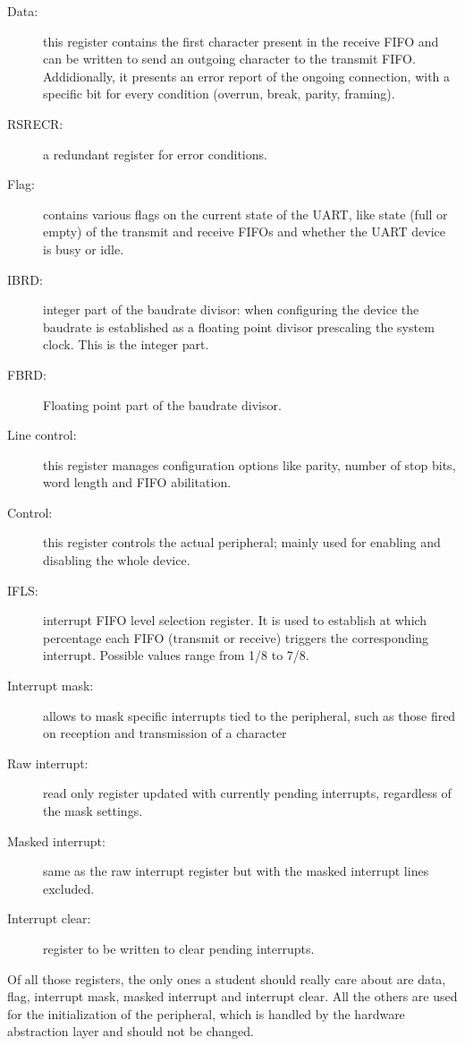 \documentclass[12pt,a4paper,openright,twoside]{report}
\begin{document}
\begin{description}
    \item[Data:] this register contains the first character present in 
            the receive FIFO and can be written to send an outgoing character to 
            the transmit FIFO. Addidionally, it presents an error report of the ongoing
            connection, with a specific bit for every condition (overrun, break,
            parity, framing).
    \item[RSRECR:] a redundant register for error conditions.
    \item[Flag:] contains various flags on the current state of the UART, like 
            state (full or empty) of the transmit and receive FIFOs and whether
            the UART device is busy or idle.
    \item[IBRD:] integer part of the baudrate divisor: when configuring the device
            the baudrate is established as a floating point divisor prescaling
            the system clock. This is the integer part.
    \item[FBRD:] Floating point part of the baudrate divisor.
    \item[Line control:] this register manages configuration options like
            parity, number of stop bits, word length and FIFO abilitation.
    \item[Control:] this register controls the actual peripheral; mainly used
            for enabling and disabling the whole device.
    \item[IFLS:] interrupt FIFO level selection register. It is used to establish 
            at which percentage each FIFO (transmit or receive) triggers the
            corresponding interrupt. Possible values range from 1/8 to 7/8.
    \item[Interrupt mask:] allows to mask specific interrupts tied to the peripheral,
            such as those fired on reception and transmission of a character
    \item[Raw interrupt:] read only register updated with currently pending
            interrupts, regardless of the mask settings.
    \item[Masked interrupt:] same as the raw interrupt register but with the
            masked interrupt lines excluded.
    \item[Interrupt clear:] register to be written to clear pending interrupts.
\end{description}

Of all those registers, the only ones a student should really care about are
data, flag, interrupt mask, masked interrupt and interrupt clear. All the others 
are used for the initialization of the peripheral, which is handled by the 
hardware abstraction layer and should not be changed.
\end{document}
